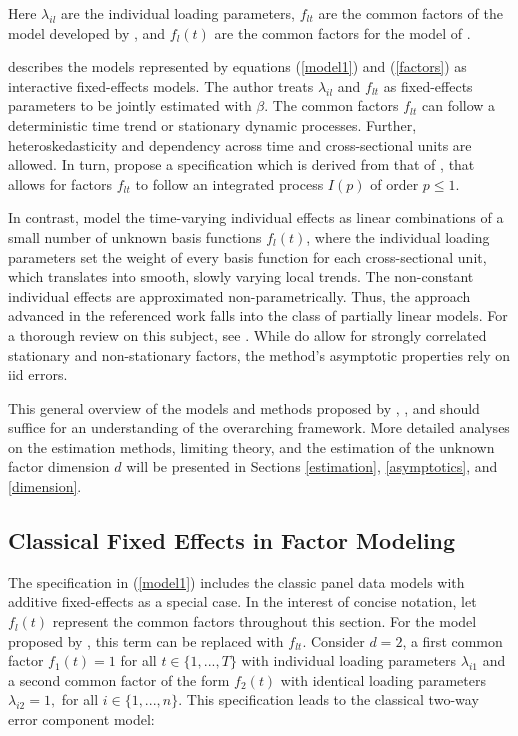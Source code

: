 Here $\lambda_{il}$ are the individual loading parameters, $f_{lt}$ are the common factors of the model developed by  \citet{bai2009panel},  and $f_{l}(t)$ are the common factors for the model of \citet{kneip2012new}. 

\citet{bai2009panel} describes the models represented by equations (\ref{model1}) and (\ref{factors}) as interactive fixed-effects models. The author treats $\lambda_{il}$ and $f_{lt}$ as fixed-effects parameters to be jointly estimated with $\beta$. The common factors $f_{lt}$ can follow a deterministic time trend or stationary dynamic processes. Further, heteroskedasticity and dependency across time and cross-sectional units are allowed. In turn, \citet{bada2014parameter} propose a specification which is derived from that of \citet{bai2009panel}, that allows for factors $f_{lt}$ to follow an integrated process $I(p)$ of order $p \leq 1$.  

In contrast,  \citet{kneip2012new} model the time-varying individual effects as linear combinations of a small number of unknown basis functions $f_l(t)$, where the individual loading parameters set the weight of every basis function for each cross-sectional unit, which translates into smooth, slowly varying local trends. The non-constant individual effects are approximated non-parametrically. Thus, the approach advanced in the referenced work falls into the class of partially linear models. For a thorough review on this subject, see \citet{hardle2000partially}.  While \citet{kneip2012new} do allow for strongly correlated stationary and non-stationary factors, the method's asymptotic properties rely on \ac{iid} errors. 
 
This general overview of the models and methods proposed by \citet{kneip2012new}, \citet{bai2009panel}, and \citet{bada2014parameter} should suffice for an understanding of the overarching framework. More detailed analyses on the estimation methods, limiting theory, and the estimation of the unknown factor dimension $d$ will be presented in Sections \ref{estimation}, \ref{asymptotics}, and \ref{dimension}. 

\subsection{Classical Fixed Effects in Factor Modeling}


The specification in (\ref{model1})  includes the classic panel data models with additive fixed-effects as a special case. In the interest of concise notation, let $f_l(t)$ represent the common factors throughout this section. For the model proposed by \citet{bai2009panel}, this term can be replaced with $f_{lt}.$ Consider $d=2$, a first common factor $f_1(t) = 1$ for all $t \in \{1, ..., T\}$ with individual loading parameters $\lambda_{i1}$ and a second common factor of the form $f_2(t)$ with identical loading parameters $\lambda_{i2} = 1,$ for all $i \in \{1, ..., n\}$. This specification leads to the classical two-way error component model:

